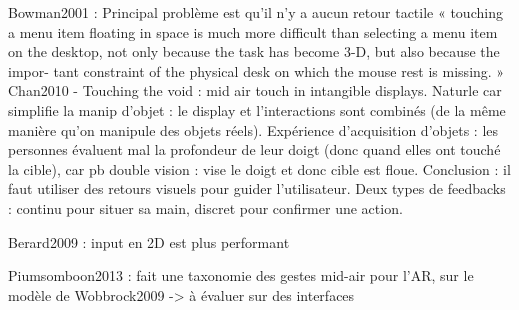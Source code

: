 
Bowman2001 : Principal problème est qu'il n'y a aucun retour tactile « touching a menu item floating in space is much more difficult than selecting a menu item on the desktop, not only because the task has become 3-D, but also because the impor- tant constraint of the physical desk on which the mouse rest is missing. »\\
Chan2010 - Touching the void : mid air touch in intangible displays. Naturle car simplifie la manip d'objet : le display et l'interactions sont combinés (de la même manière qu'on manipule des objets réels). Expérience d'acquisition d'objets : les personnes évaluent mal la profondeur de leur doigt (donc quand elles ont touché la cible), car pb double vision : vise le doigt et donc cible est floue. Conclusion : il faut utiliser des retours visuels pour guider l'utilisateur. Deux types de feedbacks : continu pour situer sa main, discret pour confirmer une action.

Berard2009 : input en 2D est plus performant

Piumsomboon2013 : fait une taxonomie des gestes mid-air pour l'AR, sur le modèle de Wobbrock2009 -> à évaluer sur des interfaces

